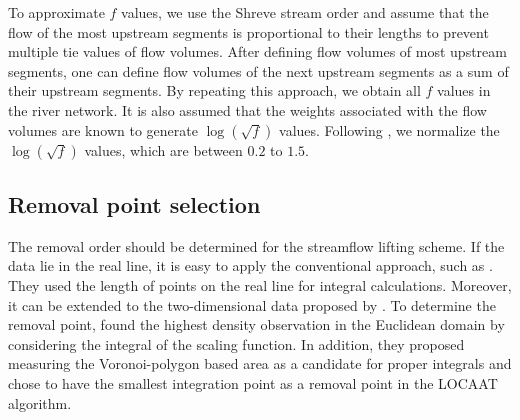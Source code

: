 \documentclass[11pt,titlepage]{article}
\begin{document}
To approximate $f$ values, we use the Shreve stream order and assume that the flow of the most upstream segments is  proportional to their lengths to prevent multiple tie values of flow volumes. After defining flow volumes of most upstream segments, one can define flow volumes of the next upstream segments as a sum of their upstream segments. By repeating this approach, we obtain all $f$ values in the river network. It is also assumed that the weights associated with the flow volumes are known to generate $\log(\sqrt{f})$ values. Following \cite{ODonnell2014}, we normalize the $\log(\sqrt{f})$ values, which are  between $0.2$ to $1.5$.
			
\subsection{Removal point selection}

The removal order should be determined for the streamflow lifting scheme. If the data lie in the real line, it is easy to apply the conventional approach, such as  \cite{Nunes2006}. They used the length of points on the real line for integral calculations. Moreover, it can be extended to the two-dimensional data proposed by \cite{Jansen2009}. To determine the removal point, \cite{Jansen2009} found the highest density observation in the Euclidean domain by considering the integral of the scaling function. In addition, they proposed measuring the Voronoi-polygon based area as a candidate for proper integrals and chose to have the smallest integration point as a removal point in the LOCAAT algorithm.
\end{document}
